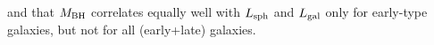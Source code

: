 \documentclass[preprint2]{emulateapj}
\begin{document}
and that $M_{\rm BH}$ correlates equally well with $L_{\rm sph}$ and $L_{\rm gal}$ only for early-type galaxies, but not for all (early+late) galaxies.
\end{document}
